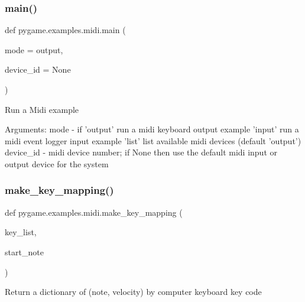 \subsubsection{\texorpdfstring{main()}{main()}}
{\footnotesize\ttfamily def pygame.\+examples.\+midi.\+main (\begin{DoxyParamCaption}\item[{}]{mode = {\ttfamily \textquotesingle{}output\textquotesingle{}},  }\item[{}]{device\+\_\+id = {\ttfamily None} }\end{DoxyParamCaption})}

\begin{DoxyVerb}Run a Midi example

Arguments:
mode - if 'output' run a midi keyboard output example
          'input' run a midi event logger input example
          'list' list available midi devices
       (default 'output')
device_id - midi device number; if None then use the default midi input or
            output device for the system\end{DoxyVerb}
 \mbox{\label{namespacepygame_1_1examples_1_1midi_a749f20282593918b41853e2d9e43d765}} 
\subsubsection{\texorpdfstring{make\+\_\+key\+\_\+mapping()}{make\_key\_mapping()}}
{\footnotesize\ttfamily def pygame.\+examples.\+midi.\+make\+\_\+key\+\_\+mapping (\begin{DoxyParamCaption}\item[{}]{key\+\_\+list,  }\item[{}]{start\+\_\+note }\end{DoxyParamCaption})}

\begin{DoxyVerb}Return a dictionary of (note, velocity) by computer keyboard key code\end{DoxyVerb}
 \mbox{\label{namespacepygame_1_1examples_1_1midi_ae161dbc463946f041f8f1c0cb2676e0b}} 
